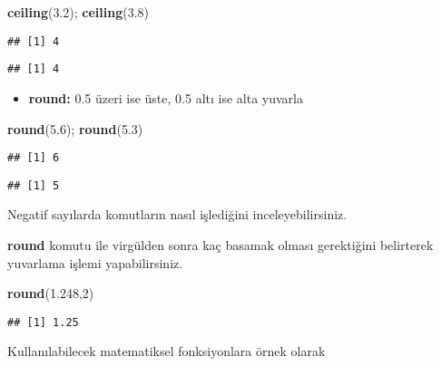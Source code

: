 \documentclass[
]{book}
\newenvironment{Shaded}{\begin{snugshade}}{\end{snugshade}}
\newcommand{\DecValTok}[1]{\textcolor[rgb]{0.00,0.00,0.81}{#1}}
\newcommand{\FloatTok}[1]{\textcolor[rgb]{0.00,0.00,0.81}{#1}}
\newcommand{\KeywordTok}[1]{\textcolor[rgb]{0.13,0.29,0.53}{\textbf{#1}}}
\newcommand{\NormalTok}[1]{#1}
\providecommand{\tightlist}{%
  \setlength{\itemsep}{0pt}\setlength{\parskip}{0pt}}
\begin{document}
\begin{Shaded}
\begin{Highlighting}[]
\KeywordTok{ceiling}\NormalTok{(}\FloatTok{3.2}\NormalTok{); }\KeywordTok{ceiling}\NormalTok{(}\FloatTok{3.8}\NormalTok{)}
\end{Highlighting}
\end{Shaded}

\begin{verbatim}
## [1] 4
\end{verbatim}

\begin{verbatim}
## [1] 4
\end{verbatim}

\begin{itemize}
\tightlist
\item
  \textbf{round:} 0.5 üzeri ise üste, 0.5 altı ise alta yuvarla
\end{itemize}

\begin{Shaded}
\begin{Highlighting}[]
\KeywordTok{round}\NormalTok{(}\FloatTok{5.6}\NormalTok{); }\KeywordTok{round}\NormalTok{(}\FloatTok{5.3}\NormalTok{)}
\end{Highlighting}
\end{Shaded}

\begin{verbatim}
## [1] 6
\end{verbatim}

\begin{verbatim}
## [1] 5
\end{verbatim}

{Negatif sayılarda komutların nasıl işlediğini inceleyebilirsiniz. }

\textbf{round} komutu ile virgülden sonra kaç basamak olması gerektiğini belirterek yuvarlama işlemi yapabilirsiniz.

\begin{Shaded}
\begin{Highlighting}[]
\KeywordTok{round}\NormalTok{(}\FloatTok{1.248}\NormalTok{,}\DecValTok{2}\NormalTok{)}
\end{Highlighting}
\end{Shaded}

\begin{verbatim}
## [1] 1.25
\end{verbatim}

Kullanılabilecek matematiksel fonksiyonlara örnek olarak \citep{Crawley2012}
\end{document}
